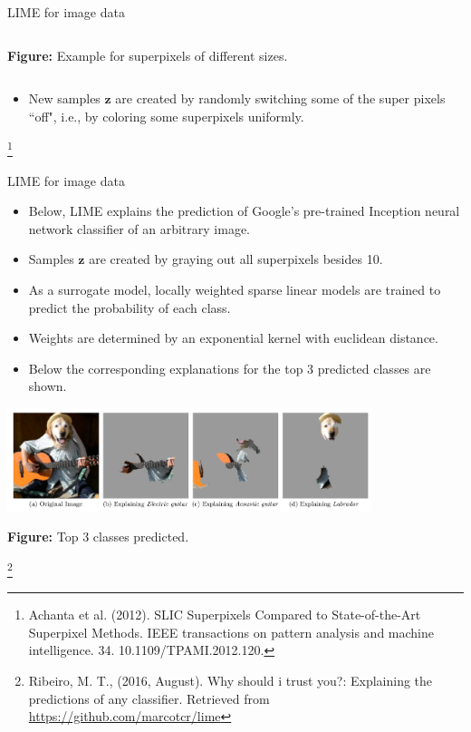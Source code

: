 \documentclass[11pt,compress,t,notes=noshow, xcolor=table]{beamer}
\newcommand{\zv}{\mathbf{z}}
\begin{document}
\begin{vbframe}{LIME for image data}
\begin{columns}
\begin{column}{0.26\textwidth}
\begin{center}
				\tiny{\textbf{Figure:} Example for superpixels of different sizes.}
			\end{center}
		\end{column}
	\end{columns}
			\begin{itemize}
		\item New samples $\zv$ are created by randomly switching some of the super pixels ``off", i.e., by coloring some superpixels uniformly.  
\end{itemize}
\footnote[frame]{Achanta et al. (2012). SLIC Superpixels Compared to State-of-the-Art Superpixel Methods. IEEE transactions on pattern analysis and machine intelligence. 34. 10.1109/TPAMI.2012.120. }
\end{vbframe}

\begin{vbframe}{LIME for image data}
	\begin{itemize}
		\item Below, LIME explains the prediction of Google's pre-trained Inception neural network classifier of an arbitrary image. 
		\item Samples $\zv$ are created by graying out all superpixels besides 10. 
		\item As a surrogate model, locally weighted sparse linear models are trained to predict the probability of each class. 
		\item Weights are determined by an exponential kernel with euclidean distance.
		\item Below the corresponding explanations for the top 3 predicted classes are shown.   
	\end{itemize}
	\vspace{-0.3cm}
	\begin{center}
		\includegraphics[width=0.8\textwidth]{figure/lime-images}
		
		\tiny{\textbf{Figure:} Top 3 classes predicted.}
	\end{center}
	\vspace{-0.3cm}
	\footnote[frame]{Ribeiro, M. T., (2016, August). Why should i trust you?: Explaining the predictions of any classifier. Retrieved from \url{https://github.com/marcotcr/lime}}
\end{vbframe}

\endlecture
\end{document}
